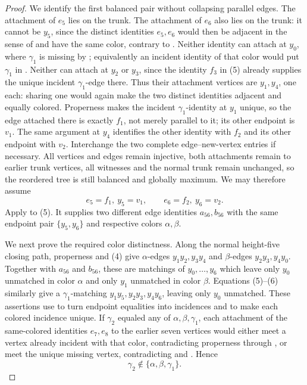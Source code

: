 \begin{proof}
We identify the first balanced pair without collapsing parallel edges.
The attachment of $e_5$ lies on the trunk.  The attachment of $e_6$ also
lies on the trunk: it cannot be $y_5$, since the distinct identities
$e_5,e_6$ would then be adjacent in the sense of
 and have the same color, contrary to
.  Neither identity can attach at $y_0$,
where $\gamma_1$ is missing by ; equivalently an
incident identity of that color would put $\gamma_1$ in
.  Neither can attach at $y_2$ or $y_3$, since the
identity $f_3$ in (5) already supplies the unique incident
$\gamma_1$-edge there.  Thus their attachment vertices are $y_1,y_4$,
one each: sharing one would again make the two distinct identities
adjacent and equally colored.  Properness makes the incident
$\gamma_1$-identity at $y_1$ unique, so the edge attached there is
exactly $f_1$, not merely parallel to it; its other endpoint is $v_1$.
The same argument at $y_4$ identifies the other identity with $f_2$ and
its other endpoint with $v_2$.  Interchange the two complete
edge--new-vertex entries if necessary.  All vertices and edges remain
injective, both attachments remain to earlier trunk vertices, all
 witnesses and the normal trunk remain unchanged,
so the reordered tree is still balanced and globally maximum.  We may
therefore assume
\[
 e_5=f_1,\ y_5=v_1,\qquad e_6=f_2,\ y_6=v_2.       \tag{6}
\]
Apply  to (5).  It supplies two
different edge identities $a_{56},b_{56}$ with the same endpoint pair
$\{y_5,y_6\}$ and respective colors $\alpha,\beta$.

We next prove the required color distinctness.  Along the normal
height-five closing path, properness and (4) give $\alpha$-edges
$y_1y_2,y_3y_4$ and $\beta$-edges $y_2y_3,y_4y_0$.  Together with
$a_{56}$ and $b_{56}$, these are matchings of $y_0,\ldots,y_6$ which
leave only $y_0$ unmatched in color $\alpha$ and only $y_1$ unmatched in
color $\beta$.  Equations (5)--(6) similarly give a
$\gamma_1$-matching $y_1y_5,y_2y_3,y_4y_6$, leaving only $y_0$
unmatched.  These assertions use  to turn endpoint
equalities into incidences and  to make
each colored incidence unique.  If $\gamma_2$ equaled any of
$\alpha,\beta,\gamma_1$, each attachment of the same-colored identities
$e_7,e_8$ to the earlier seven vertices would either meet a vertex
already incident with that color, contradicting properness through
, or meet the unique missing vertex, contradicting
 and .  Hence
\[
 \gamma_2\notin\{\alpha,\beta,\gamma_1\}.           \tag{7}
\]


\end{proof}

